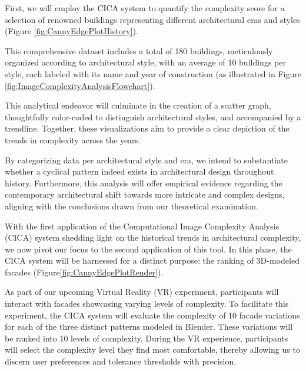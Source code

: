 First, we will employ the CICA system to quantify the complexity score for a selection of renowned buildings representing different architectural eras and styles (Figure \ref{fig:CannyEdgePlotHistory}).

This comprehensive dataset includes a total of 180 buildings, meticulously organized according to architectural style, with an average of 10 buildings per style, each labeled with its name and year of construction (as illustrated in Figure \ref{fig:ImageComplexityAnalysisFlowchart}).

This analytical endeavor will culminate in the creation of a scatter graph, thoughtfully color-coded to distinguish architectural styles, and accompanied by a trendline.
Together, these visualizations aim to provide a clear depiction of the trends in complexity across the years.

By categorizing data per architectural style and era, we intend to substantiate whether a cyclical pattern indeed exists in architectural design throughout history.
Furthermore, this analysis will offer empirical evidence regarding the contemporary architectural shift towards more intricate and complex designs, aligning with the conclusions drawn from our theoretical examination.


With the first application of the Computational Image Complexity Analysis (CICA) system shedding light on the historical trends in architectural complexity, we now pivot our focus to the second application of this tool.
In this phase, the CICA system will be harnessed for a distinct purpose: the ranking of 3D-modeled facades (Figure\ref{fig:CannyEdgePlotRender}).

As part of our upcoming Virtual Reality (VR) experiment, participants will interact with facades showcasing varying levels of complexity.
To facilitate this experiment, the CICA system will evaluate the complexity of 10 facade variations for each of the three distinct patterns modeled in Blender.
These variations will be ranked into 10 levels of complexity.
During the VR experience, participants will select the complexity level they find most comfortable, thereby allowing us to discern user preferences and tolerance thresholds with precision.

